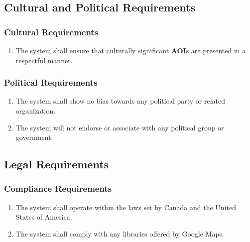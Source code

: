 \documentclass[titlepage]{article}
\begin{document}
		
		\subsection{Cultural and Political Requirements}
		\label{sub:cultural_and_political_requirements}
		
		\subsubsection{Cultural Requirements}
		\label{ssub:cultural_requirements}
		\begin{enumerate}
			\item
			The system shall ensure that culturally significant \textbf{AOI}s are presented in a respectful manner.
		\end{enumerate}
		
		\subsubsection{Political Requirements}
		\label{ssub:political_requirements}
		\begin{enumerate}
			\item
			The system shall show no bias towards any political party or related organization.
			\item
			The system will not endorse or associate with any political group or government.
		\end{enumerate}
		
		\subsection{Legal Requirements}
		\label{sub:legal_requirements}
		
		\subsubsection{Compliance Requirements}
		\label{ssub:compliance_requirements}
		\begin{enumerate}[{LR}1. ]
			\item
			The system shall operate within the laws set by Canada and the United States of America.
			\item
			The system shall comply with any libraries offered by Google Maps.
		\end{enumerate}
		
\end{document}
